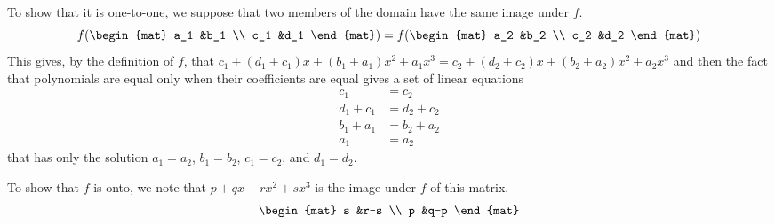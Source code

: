 \begin{exercises}
\begin{answer}
\begin{exparts}
        To show that it is one-to-one, we suppose that two members of the
        domain have the same image under $f$.
        \begin{equation*}
          f(\begin{mat}
              a_1  &b_1  \\
              c_1  &d_1
            \end{mat})
          =f(\begin{mat}
              a_2  &b_2  \\
              c_2  &d_2
            \end{mat})
        \end{equation*}
        This gives, by the definition of $f$, that 
        $c_1+(d_1+c_1)x+(b_1+a_1)x^2+a_1x^3
          =c_2+(d_2+c_2)x+(b_2+a_2)x^2+a_2x^3$
        and then the fact that polynomials are equal only when their
        coefficients are equal gives a set of linear equations
        \begin{align*}
          c_1      &=  c_2      \\
          d_1+c_1  &=  d_2+c_2  \\
          b_1+a_1  &=  b_2+a_2  \\
          a_1      &=  a_2
        \end{align*}
        that has only the solution $a_1=a_2$, $b_1=b_2$, $c_1=c_2$, and 
        $d_1=d_2$.

        To show that $f$ is onto, we note that $p+qx+rx^2+sx^3$ is the image
        under $f$ of this matrix.
        \begin{equation*}
          \begin{mat}
            s  &r-s   \\
            p  &q-p
          \end{mat}
        \end{equation*}


\end{exparts}
\end{answer}
\end{exercises}
